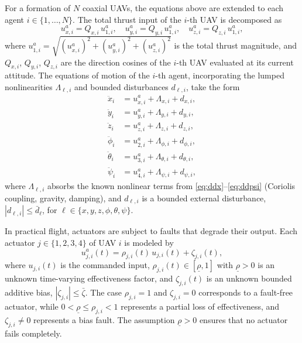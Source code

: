 For a formation of $N$ coaxial UAVs, the equations above are extended to each agent
$i \in \{1, \ldots, N\}$. The total thrust input of the $i$-th UAV is decomposed as
\begin{equation}
u_{x,i}^a = Q_{x,i}\,u_{1,i}^a, \quad
u_{y,i}^a = Q_{y,i}\,u_{1,i}^a, \quad
u_{z,i}^a = Q_{z,i}\,u_{1,i}^a,
\end{equation}
where $u_{1,i}^a = \sqrt{(u_{x,i}^a)^2 + (u_{y,i}^a)^2 + (u_{z,i}^a)^2}$ is the
total thrust magnitude, and $Q_{x,i}$, $Q_{y,i}$, $Q_{z,i}$ are the direction cosines
of the $i$-th UAV evaluated at its current attitude. The equations of motion of the
$i$-th agent, incorporating the lumped nonlinearities $\Lambda_{\ell,i}$ and bounded
disturbances $d_{\ell,i}$, take the form
\begin{align}
\ddot{x}_i     &= u_{x,i}^a + \Lambda_{x,i} + d_{x,i}, \label{eq:xi}\\
\ddot{y}_i     &= u_{y,i}^a + \Lambda_{y,i} + d_{y,i}, \label{eq:yi}\\
\ddot{z}_i     &= u_{z,i}^a + \Lambda_{z,i} + d_{z,i}, \label{eq:zi}\\
\ddot{\phi}_i   &= u_{2,i}^a + \Lambda_{\phi,i}   + d_{\phi,i}, \label{eq:phii}\\
\ddot{\theta}_i &= u_{3,i}^a + \Lambda_{\theta,i} + d_{\theta,i}, \label{eq:thetai}\\
\ddot{\psi}_i   &= u_{4,i}^a + \Lambda_{\psi,i}   + d_{\psi,i}, \label{eq:psii}
\end{align}
where $\Lambda_{\ell,i}$ absorbs the known nonlinear terms from
\eqref{eq:ddx}--\eqref{eq:ddpsi} (Coriolis coupling, gravity, damping), and
$d_{\ell,i}$ is a bounded external disturbance, $|d_{\ell,i}| \leq \bar{d}_{\ell}$,
for $\ell \in \{x, y, z, \phi, \theta, \psi\}$.

In practical flight, actuators are subject to faults that degrade their output. Each
actuator $j \in \{1, 2, 3, 4\}$ of UAV $i$ is modeled by
\begin{equation}
u_{j,i}^a(t) = \rho_{j,i}(t)\,u_{j,i}(t) + \zeta_{j,i}(t),
\label{eq:fault}
\end{equation}
where $u_{j,i}(t)$ is the commanded input, $\rho_{j,i}(t) \in [\underline{\rho}, 1]$
with $\underline{\rho} > 0$ is an unknown time-varying effectiveness factor, and
$\zeta_{j,i}(t)$ is an unknown bounded additive bias, $|\zeta_{j,i}| \leq
\bar{\zeta}$. The case $\rho_{j,i} = 1$ and $\zeta_{j,i} = 0$ corresponds to a
fault-free actuator, while $0 < \underline{\rho} \leq \rho_{j,i} < 1$ represents
a partial loss of effectiveness, and $\zeta_{j,i} \neq 0$ represents a bias fault.
The assumption $\underline{\rho} > 0$ ensures that no actuator fails completely.


